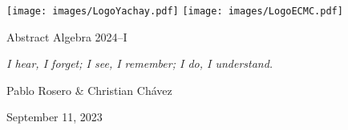 \pagebreak

\begin{center}
    \texttt{[image: images/LogoYachay.pdf]} 
        \hfill
    \texttt{[image: images/LogoECMC.pdf]}
\end{center}

\pdfbookmark{\currfilebase}{\currfilebase}

\begin{center}
    {\LARGE
    Abstract Algebra 2024--I\\
    \vspace{0.25cm}
    \textbf{\thetitle{}}}

    \emph{I hear, I forget;
    I see, I remember;
    I do, I understand.}
    
    Pablo Rosero \& Christian Chávez
    

    September 11, 2023
\end{center}

